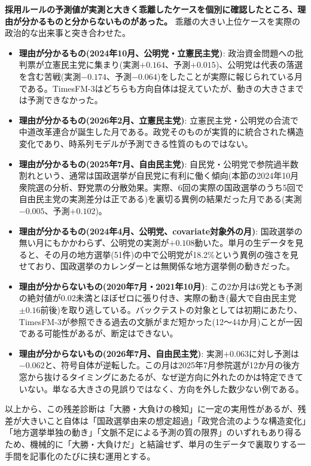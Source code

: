 \documentclass[a4paper,11pt]{ltjsarticle}
\begin{document}
\textbf{採用ルールの予測値が実測と大きく乖離したケースを個別に確認したところ、理由が分かるものと分からないものがあった。} 乖離の大きい上位ケースを実際の政治的な出来事と突き合わせた。

\begin{itemize}
  \item \textbf{理由が分かるもの(2024年10月、公明党・立憲民主党)}: 政治資金問題への批判票が立憲民主党に集まり(実測$+0.164$、予測$+0.015$)、公明党は代表の落選を含む苦戦(実測$-0.174$、予測$-0.064$)をしたことが実際に報じられている月である。TimesFM-3はどちらも方向自体は捉えていたが、動きの大きさまでは予測できなかった。
  \item \textbf{理由が分かるもの(2026年2月、立憲民主党)}: 立憲民主党・公明党の合流で中道改革連合が誕生した月である。政党そのものが実質的に統合された構造変化であり、時系列モデルが予測できる性質のものではない。
  \item \textbf{理由が分かるもの(2025年7月、自由民主党)}: 自民党・公明党で参院過半数割れという、通常は国政選挙が自民党に有利に働く傾向(本節の2024年10月衆院選の分析、野党票の分散効果。実際、6回の実際の国政選挙のうち5回で自由民主党の実測差分は正である)を裏切る異例の結果だった月である(実測$-0.005$、予測$+0.102$)。
  \item \textbf{理由が分かるもの(2024年4月、公明党、covariate対象外の月)}: 国政選挙の無い月にもかかわらず、公明党の実測が$+0.108$動いた。単月の生データを見ると、その月の地方選挙(51件)の中で公明党が18.2\%という異例の強さを見せており、国政選挙のカレンダーとは無関係な地方選挙側の動きだった。
  \item \textbf{理由が分からないもの(2020年7月・2021年10月)}: この2か月は6党とも予測の絶対値が0.02未満とほぼゼロに張り付き、実際の動き(最大で自由民主党$\pm0.16$前後)を取り逃している。バックテストの対象としては初期にあたり、TimesFM-3が参照できる過去の文脈がまだ短かった(12〜44か月)ことが一因である可能性があるが、断定はできない。
  \item \textbf{理由が分からないもの(2026年7月、自由民主党)}: 実測$+0.063$に対し予測は$-0.062$と、符号自体が逆転した。この月は2025年7月参院選が12か月の後方窓から抜けるタイミングにあたるが、なぜ逆方向に外れたのかは特定できていない。単なる大きさの見誤りではなく、方向を外した数少ない例である。
\end{itemize}

以上から、この残差診断は「大勝・大負けの検知」に一定の実用性があるが、残差が大きいこと自体は「国政選挙由来の想定超過」「政党合流のような構造変化」「地方選挙単独の動き」「文脈不足による予測の質の限界」のいずれもあり得るため、機械的に「大勝・大負けだ」と結論せず、単月の生データで裏取りする一手間を記事化のたびに挟む運用とする。
\end{document}
